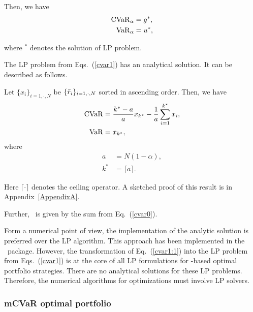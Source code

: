 \noindent Then, we have
\begin{subequations}\label{cvar2}
\begin{align}
    \CVaR_\alpha &= g^*, \label{cvar2a} \\
    \VaR_\alpha &= u^*, \label{cvar2b}
\end{align}
\end{subequations}

\noindent where $^*$ denotes the solution of LP problem.


The LP problem from Eqs.~(\ref{cvar1}) has an analytical solution. It can be described as follows.

\bigskip
\noindent Let $\{x_i\}_{i=1,\cdot,N}$
be $\{{\bar r}_i\}_{i=1,\cdot,N}$ sorted in ascending order. Then, we have
\begin{subequations}\label{cvar3}
\begin{align}
    \CVaR &= \frac{k^* - a}{a} x_{k^*} - \frac{1}{a} \sum_{i=1}^{k^*} x_i, \label{cvar3a} \\
    \VaR &= x_{k^*}, \label{cvar3b}
\end{align}
\end{subequations}
where
\begin{subequations}\label{cvar4}
\begin{align}
    a &= N(1-\alpha), \label{cvar4a} \\
    k^* &= \lceil a \rceil. \label{cvar4b}
\end{align}
\end{subequations}

\noindent Here $\lceil\cdot\rceil$ denotes the ceiling operator.
A sketched proof of this result is in Appendix~\ref{AppendixA}.

\noindent Further, \mCVaR\ is given by the sum from Eq.~(\ref{cvar0}).

Form a numerical point of view, the implementation of the analytic solution is preferred over the LP algorithm.
This approach has been implemented in the \azapy\ package.
However, the transformation of Eq.~(\ref{cvar1:1})
into the LP problem from Eqs.~(\ref{cvar1}) is at the core of all LP formulations for \mCVaR-based optimal portfolio strategies.
There are no analytical solutions for these LP problems.
Therefore, the numerical algorithms for optimizations must involve LP solvers.

\BackToContents

\subsubsection{mCVaR optimal portfolio}

